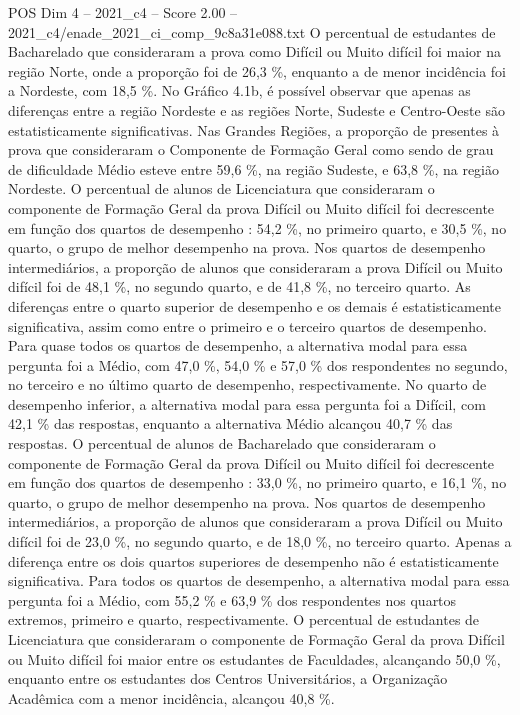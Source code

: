 \begin{textsample}{POS Dim 4 – 2021\_c4 – Score 2.00 – 2021\_c4/enade\_2021\_ci\_comp\_9c8a31e088.txt}
O percentual de estudantes de Bacharelado que consideraram a prova como Difícil ou Muito difícil foi maior na região Norte, onde a proporção foi de 26,3 \%, enquanto a de menor incidência foi a Nordeste, com 18,5 \%.
No Gráfico 4.1b, é possível observar que apenas as diferenças entre a região Nordeste e as regiões Norte, Sudeste e Centro-Oeste são estatisticamente significativas.
Nas Grandes Regiões, a proporção de presentes à prova que consideraram o Componente de Formação Geral como sendo de grau de dificuldade Médio esteve entre 59,6 \%, na região Sudeste, e 63,8 \%, na região Nordeste.
O percentual de alunos de Licenciatura que consideraram o componente de Formação Geral da prova Difícil ou Muito difícil foi decrescente em função dos quartos de desempenho : 54,2 \%, no primeiro quarto, e 30,5 \%, no quarto, o grupo de melhor desempenho na prova.
Nos quartos de desempenho intermediários, a proporção de alunos que consideraram a prova Difícil ou Muito difícil foi de 48,1 \%, no segundo quarto, e de 41,8 \%, no terceiro quarto.
As diferenças entre o quarto superior de desempenho e os demais é estatisticamente significativa, assim como entre o primeiro e o terceiro quartos de desempenho.
Para quase todos os quartos de desempenho, a alternativa modal para essa pergunta foi a Médio, com 47,0 \%, 54,0 \% e 57,0 \% dos respondentes no segundo, no terceiro e no último quarto de desempenho, respectivamente.
No quarto de desempenho inferior, a alternativa modal para essa pergunta foi a Difícil, com 42,1 \% das respostas, enquanto a alternativa Médio alcançou 40,7 \% das respostas.
O percentual de alunos de Bacharelado que consideraram o componente de Formação Geral da prova Difícil ou Muito difícil foi decrescente em função dos quartos de desempenho : 33,0 \%, no primeiro quarto, e 16,1 \%, no quarto, o grupo de melhor desempenho na prova.
Nos quartos de desempenho intermediários, a proporção de alunos que consideraram a prova Difícil ou Muito difícil foi de 23,0 \%, no segundo quarto, e de 18,0 \%, no terceiro quarto.
Apenas a diferença entre os dois quartos superiores de desempenho não é estatisticamente significativa.
Para todos os quartos de desempenho, a alternativa modal para essa pergunta foi a Médio, com 55,2 \% e 63,9 \% dos respondentes nos quartos extremos, primeiro e quarto, respectivamente.
O percentual de estudantes de Licenciatura que consideraram o componente de Formação Geral da prova Difícil ou Muito difícil foi maior entre os estudantes de Faculdades, alcançando 50,0 \%, enquanto entre os estudantes dos Centros Universitários, a Organização Acadêmica com a menor incidência, alcançou 40,8 \%.

\end{textsample}
